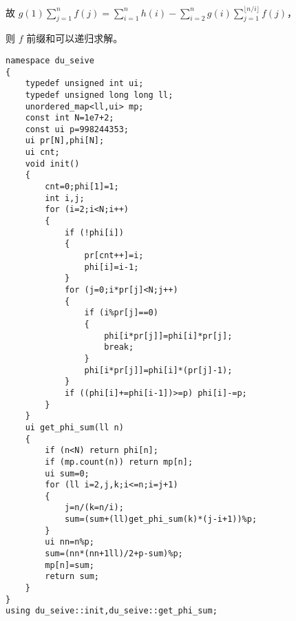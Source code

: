 \documentclass[12pt]{ctexart}
\begin{document}
故 $g(1)\sum\limits_{j=1}^n f(j)=\sum\limits_{i=1}^n h(i)-\sum\limits_{i=2}^n g(i)\sum\limits_{j=1}^{\lfloor n/i\rfloor}f(j)$，

则 $f$ 前缀和可以递归求解。

\begin{lstlisting}
namespace du_seive
{
	typedef unsigned int ui;
	typedef unsigned long long ll;
	unordered_map<ll,ui> mp;
	const int N=1e7+2;
	const ui p=998244353;
	ui pr[N],phi[N];
	ui cnt;
	void init()
	{
		cnt=0;phi[1]=1;
		int i,j;
		for (i=2;i<N;i++)
		{
			if (!phi[i])
			{
				pr[cnt++]=i;
				phi[i]=i-1;
			}
			for (j=0;i*pr[j]<N;j++)
			{
				if (i%pr[j]==0)
				{
					phi[i*pr[j]]=phi[i]*pr[j];
					break;
				}
				phi[i*pr[j]]=phi[i]*(pr[j]-1);
			}
			if ((phi[i]+=phi[i-1])>=p) phi[i]-=p;
		}
	}
	ui get_phi_sum(ll n)
	{
		if (n<N) return phi[n];
		if (mp.count(n)) return mp[n];
		ui sum=0;
		for (ll i=2,j,k;i<=n;i=j+1)
		{
			j=n/(k=n/i);
			sum=(sum+(ll)get_phi_sum(k)*(j-i+1))%p;
		}
		ui nn=n%p;
		sum=(nn*(nn+1ll)/2+p-sum)%p;
		mp[n]=sum;
		return sum;
	}
}
using du_seive::init,du_seive::get_phi_sum;
\end{lstlisting}
\end{document}
